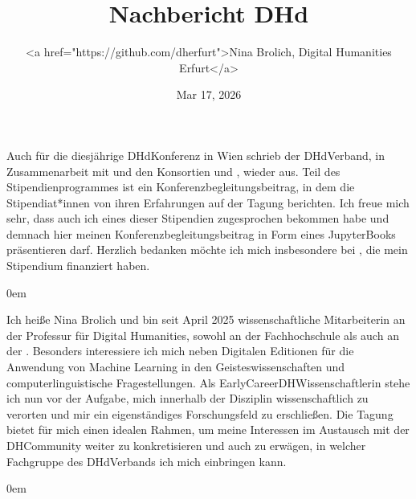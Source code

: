 \documentclass[letterpaper,10pt,english]{jupyterBook}
\title{Nachbericht DHd}
\date{Mar 17, 2026}
\author{<a href="https://github.com/dh\sphinxhyphen{}erfurt">Nina Brolich, Digital Humanities Erfurt</a>}
\begin{document}
\pagestyle{empty}
\sphinxmaketitle
\pagestyle{plain}
\sphinxtableofcontents
\pagestyle{normal}
\label{\detokenize{home::doc}}


\sphinxAtStartPar
Auch für die diesjährige DHd\sphinxhyphen{}Konferenz in Wien schrieb der DHd\sphinxhyphen{}Verband, in Zusammenarbeit mit  und den Konsortien  und , wieder  aus. Teil des Stipendienprogrammes ist ein Konferenzbegleitungsbeitrag, in dem die Stipendiat*innen von ihren Erfahrungen auf der Tagung berichten. Ich freue mich sehr, dass auch ich eines dieser Stipendien zugesprochen bekommen habe und demnach hier meinen Konferenzbegleitungsbeitrag in Form eines JupyterBooks präsentieren darf. Herzlich bedanken möchte ich mich insbesondere bei , die mein Stipendium finanziert haben.

\begin{DUlineblock}{0em}
\item[] 
\end{DUlineblock}

\sphinxAtStartPar
Ich heiße Nina Brolich und bin seit April 2025 wissenschaftliche Mitarbeiterin an der Professur für Digital Humanities, sowohl an der Fachhochschule als auch an der . Besonders interessiere ich mich neben Digitalen Editionen für die Anwendung von Machine Learning in den Geisteswissenschaften und computerlinguistische Fragestellungen. Als Early\sphinxhyphen{}Career\sphinxhyphen{}DH\sphinxhyphen{}Wissenschaftlerin stehe ich nun vor der Aufgabe, mich innerhalb der Disziplin wissenschaftlich zu verorten und mir ein eigenständiges
Forschungsfeld zu erschließen. Die Tagung bietet für mich einen idealen Rahmen, um
meine Interessen im Austausch mit der DH\sphinxhyphen{}Community weiter zu konkretisieren und auch zu
erwägen, in welcher Fachgruppe des DHd\sphinxhyphen{}Verbands ich mich einbringen kann.

\begin{DUlineblock}{0em}
\item[] 
\end{DUlineblock}
\end{document}
